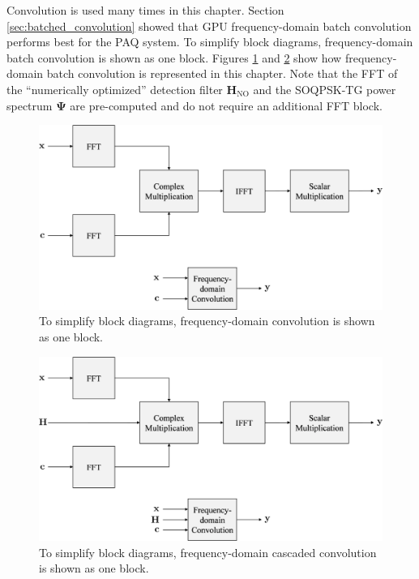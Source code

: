 Convolution is used many times in this chapter.
Section \ref{sec:batched_convolution} showed that GPU frequency-domain batch convolution performs best for the PAQ system.
To simplify block diagrams, frequency-domain batch convolution is shown as one block.
Figures \ref{fig:Conv2} and \ref{fig:Conv3} show how frequency-domain batch convolution is represented in this chapter.
Note that the FFT of the ``numerically optimized'' detection filter $\mathbf{H}_\text{NO}$ and the SOQPSK-TG power spectrum $\mathbf{\Psi}$ are pre-computed and do not require an additional FFT block.
\begin{figure}
	\centering\includegraphics[width=10.28in/100*55]{figures/eq_GPUimplementation/Conv2.pdf}
	\caption{To simplify block diagrams, frequency-domain convolution is shown as one block.}
	\label{fig:Conv2}
\end{figure}
\begin{figure}
	\centering\includegraphics[width=10.28in/100*55]{figures/eq_GPUimplementation/Conv3.pdf}
	\caption{To simplify block diagrams, frequency-domain cascaded convolution is shown as one block.}
	\label{fig:Conv3}
\end{figure}

